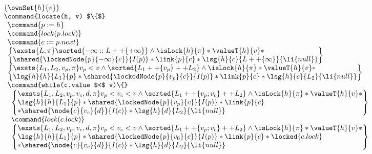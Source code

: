 \[
\begin{array}{l}
	\left\{\ownSet{h}{v} \right\}\\
	\command{locate(h, v) $\{$}\\
	\begin{array}{l}
		\command{p:= h}\\
		\command{lock(p.lock)}\\
		\command{c:= p.next}\\
		
		\left\{
		\begin{array}{@{} l @{}}
			\exsts{L, \pi} \sorted{-\infty :: L ++ \{+\infty\}} \land  \isLock{h}{\pi} * \valueT{h}{v} * \\
			 \shared{\lockedNode{p}{-\infty}{c}}{I(p)} * \link{p}{c} * \lsg{h}{c}{L++\{\infty\}}{\li{null}}
		\end{array}	 
		\right\}\\
		
		
		\left\{
		\begin{array}{@{} l @{}}
			\exsts{L_1, L_2, v_p, \pi} v_p < v \land \sorted{L_1 ++\{v_p\}  ++ L_2}  \land \isLock{h}{\pi}  * \valueT{h}{v} * \\
			\lsg{h}{h}{L_1}{p} * \shared{\lockedNode{p}{v_p}{c}}{I(p)} * \link{p}{c} * \lsg{h}{c}{L_2}{\li{null}}
		\end{array}
		\right\}\\
		
		\command{while(c.value $<$ v)\{}\\
			\begin{array}{l}
				\left\{
				\begin{array}{@{} l @{}}
					\exsts{L_1, L_2, v_p, v_c, d, \pi} v_p < v_c < v \land  \sorted{L_1 ++ \{v_p; v_c\} ++L_2}  \land \isLock{h}{\pi}  * \valueT{h}{v} * \\
					\lsg{h}{h}{L_1}{p} * 
				 	\shared{\lockedNode{p}{v_p}{c}}{I(p)} * \link{p}{c}\\ 
				 	* \shared{\node{c}{v_c}{d}}{I(c)} * \lsg{h}{d}{L_2}{\li{null}}
				 	
			 	\end{array}
			 	\right\}\\
			 	
			 	
			 	\command{lock(c.lock)}\\
			 	
			 	\left\{
				\begin{array}{@{} l @{}}
			 		\exsts{L_1, L_2, v_p, v_c, d, \pi} v_p < v_c < v \land \sorted{L_1 ++ \{v_p; v_c\} ++L_2}  \land \isLock{h}{\pi}  * \valueT{h}{v} * \\
					\lsg{h}{h}{L_1}{p} * 
			 		\shared{\lockedNode{p}{v_0}{c}}{I(p)} * \link{p}{c} * \locked{c.lock} \\ 
			 		* \shared{\node{c}{v_c}{d}}{I(c)} * \lsg{h}{d}{L_2}{\li{null}}
			 	\end{array}
			 	\right\}\\
			 	

\end{array}
\end{array}
\end{array}\]
